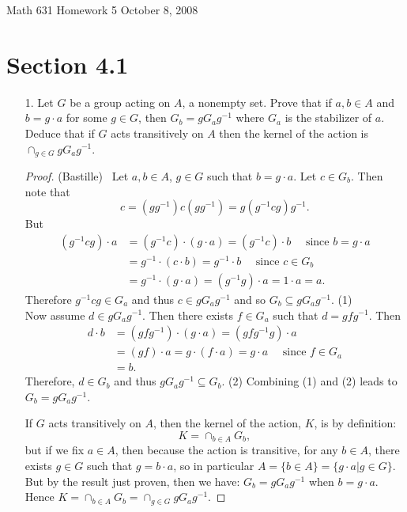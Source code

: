 \documentclass[10pt]{article}
\newcommand\header{\sc Math 631 \hfill Homework 5 \hfill October 8, 2008}
\begin{document}
\header
\section*{Section 4.1}

\begin{itemize}

\item[1.]  Let $G$ be a group acting on $A$, a nonempty set. Prove that if $a,b \in A$ and $b=g \cdot a$ for some $
g \in G$, then $G_b=gG_ag^{-1}$ where $G_a$ is the stabilizer of
$a$. Deduce that if $G$ acts transitively on $A$ then the kernel of
the action is $\cap_{g \in G}gG_ag^{-1}$.
\begin{proof}(Bastille) \ Let $a,b \in A$, $g \in G$ such that $b=g \cdot a$. Let $c \in G_b$. Then note that $$c=(gg^{-1})c(gg^{-1})=g(g^{-1}cg)g^{-1}.$$
But
\begin{align*}
(g^{-1}cg)\cdot a &= (g^{-1}c)\cdot (g \cdot a)=(g^{-1}c) \cdot b \quad \text{ since }b= g \cdot a \\
                                    &= g^{-1} \cdot (c \cdot b)= g^{-1} \cdot b \quad \text{ since } c \in G_b \\
                                    &= g^{-1} \cdot (g \cdot a)= (g^{-1}g) \cdot a=1 \cdot a =a.
\end{align*}
Therefore $g^{-1}cg \in G_a$ and thus $c \in gG_ag^{-1}$ and so $G_b \subseteq gG_ag^{-1}$. (1) \\
Now assume $d \in gG_ag^{-1}$. Then there exists $f \in G_a$ such
that $d=gfg^{-1}$. Then
\begin{align*}
d \cdot b &= (gfg^{-1}) \cdot (g \cdot a)=(gfg^{-1}g) \cdot a \\
                    &= (gf) \cdot a=g \cdot (f \cdot a)= g \cdot a \quad \text{ since } f \in G_a \\
                    &=b.
\end{align*}
Therefore, $d \in G_b$ and thus $gG_ag^{-1} \subseteq G_b$. (2)
Combining (1) and (2) leads to $G_b=gG_ag^{-1}$.

If $G$ acts transitively on $A$, then the kernel of the action, $K$,
is by definition:
$$K= \cap_{b \in A} G_b,$$
but if we fix $a \in A$, then because the action is transitive, for
any $b \in A$, there exists $g \in G$ such that $g= b \cdot a$, so
in particular $A=\{b \in A \}=\{g \cdot a | g \in G \}$. But by the
result just proven, then we have: $G_b=gG_ag^{-1}$ when $b= g \cdot
a$. Hence $K= \cap_{b \in A}G_b= \cap_{g \in G}gG_ag^{-1}$.


\end{proof}
\end{itemize}
\end{document}
